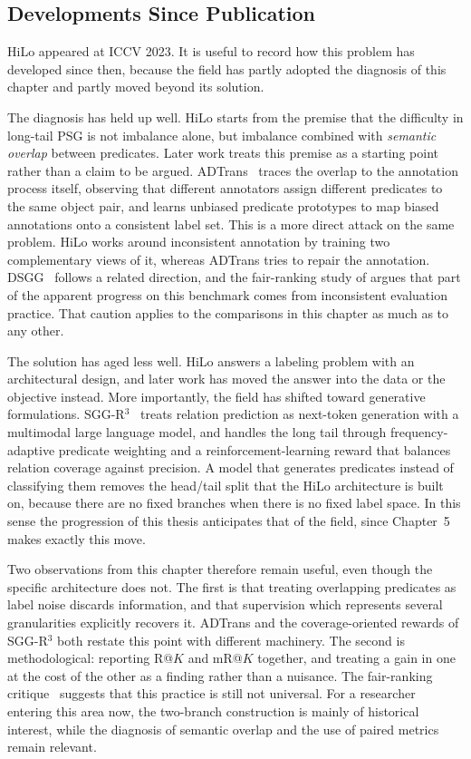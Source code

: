 \subsection{Developments Since Publication}
\label{hilo:sec:post_publication}
HiLo appeared at ICCV 2023. It is useful to record how this problem has developed since then, because the field has partly adopted the diagnosis of this chapter and partly moved beyond its solution.

The diagnosis has held up well. HiLo starts from the premise that the difficulty in long-tail PSG is not imbalance alone, but imbalance combined with \emph{semantic overlap} between predicates. Later work treats this premise as a starting point rather than a claim to be argued. ADTrans~\citep{li2024semantics} traces the overlap to the annotation process itself, observing that different annotators assign different predicates to the same object pair, and learns unbiased predicate prototypes to map biased annotations onto a consistent label set. This is a more direct attack on the same problem. HiLo works around inconsistent annotation by training two complementary views of it, whereas ADTrans tries to repair the annotation. DSGG~\citep{hayder2024dsgg} follows a related direction, and the fair-ranking study of \citet{lorenz2024fair} argues that part of the apparent progress on this benchmark comes from inconsistent evaluation practice. That caution applies to the comparisons in this chapter as much as to any other.

The solution has aged less well. HiLo answers a labeling problem with an architectural design, and later work has moved the answer into the data or the objective instead. More importantly, the field has shifted toward generative formulations. SGG-R$^3$~\citep{feng2026sggr3} treats relation prediction as next-token generation with a multimodal large language model, and handles the long tail through frequency-adaptive predicate weighting and a reinforcement-learning reward that balances relation coverage against precision. A model that generates predicates instead of classifying them removes the head/tail split that the HiLo architecture is built on, because there are no fixed branches when there is no fixed label space. In this sense the progression of this thesis anticipates that of the field, since Chapter~5 makes exactly this move.

Two observations from this chapter therefore remain useful, even though the specific architecture does not. The first is that treating overlapping predicates as label noise discards information, and that supervision which represents several granularities explicitly recovers it. ADTrans and the coverage-oriented rewards of SGG-R$^3$ both restate this point with different machinery. The second is methodological: reporting R@$K$ and mR@$K$ together, and treating a gain in one at the cost of the other as a finding rather than a nuisance. The fair-ranking critique~\citep{lorenz2024fair} suggests that this practice is still not universal. For a researcher entering this area now, the two-branch construction is mainly of historical interest, while the diagnosis of semantic overlap and the use of paired metrics remain relevant.
